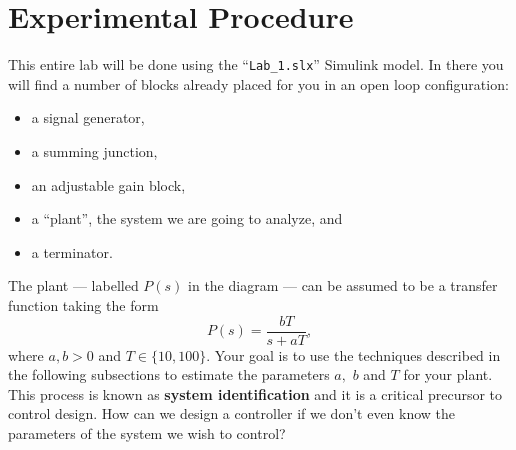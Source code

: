 \section{Experimental Procedure}
This entire lab will be done using the ``\texttt{Lab\_1.slx}'' Simulink model.
In there you will
find a number of blocks already placed for you in an open loop configuration:
\begin{itemize}
  \item{a signal generator,}
  \item{a summing junction,}
  \item{an adjustable gain block,}
  \item{a ``plant'', the system we are going to analyze, and}
  \item{a terminator.}
\end{itemize}
%
The plant --- labelled \(P(s)\) in the diagram --- can be assumed to be a
transfer function taking the form
\[
  P(s) = \frac{b T}{s + a T},
\]
where \(a, b > 0\) and \(T \in \{10, 100\}.\) Your goal is to use the
techniques described in the following subsections to estimate the parameters
\(a,\) \(b\) and \(T\) for your plant. This process is known as
\textbf{system identification} and it is a critical precursor to control
design. How can we design a controller if we don't even know the parameters
of the system we wish to control?

